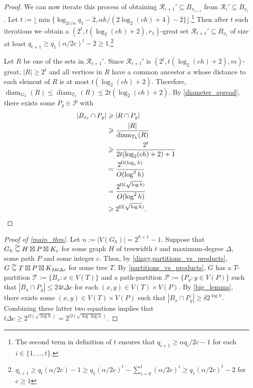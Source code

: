\documentclass{patmorin}
\DeclareMathOperator{\diam}{diam}
\renewcommand{\le}{\leqslant}
\renewcommand{\ge}{\geqslant}
\newcommand\subsetcong{\mathrel{\text{%
    \setbox0\hbox{$\subseteq$}%
    \rlap{\hbox to \wd0{\hss\hss\hss\raisebox{1.5\height}{$\sim$}\hss}}\box0
}}}
\begin{document}
\begin{proof}
  We can now iterate this process of obtaining $\mathcal{R}_{i+1}'\subseteq B_{x_{i+1}}$ from $\mathcal{R}_i'\subseteq B_{x_i}$. Let $t:= \lfloor \min\{\log_{2c/\alpha} q_1-2,\alpha h/(2\log_2(ch)+4)-2\}\rfloor$.\footnote{The second term in definition of $t$ ensures that $q_{i+1}\ge \alpha q_i/2c-1$ for each $i\in\{1,\ldots,t\}$.}   Then after $t$ such iterations we obtain a $(2^t,t(\log_2(ch)+2),r_1)$-great set $\mathcal{R}_{t+1}'\subseteq B_{x_t}$ of size at least $q_{t+1} \ge q_1(\alpha/2c)^t-2 \ge 1$.\footnote{$q_{t+1} \ge q_t(\alpha/2c) - 1 \ge q_1(\alpha/2c)^t - \sum_{i=0}^t (\alpha/2c)^i \ge q_1(\alpha/2c)^t - 2$ for $c\ge 1$}

  Let $R$ be one of the sets in $\mathcal{R}_{t+1}'$.  Since $\mathcal{R}_{t+1}'$ is $(2^t,t(\log_2(ch)+2),m)$-great, $|R|\ge 2^t$ and all vertices in $R$ have a common ancestor $a$ whose distance to each element of $R$ is at most $t(\log_2(ch)+2)$.  Therefore, $\diam_{G_h}(R)\le\diam_{T_h}(R)\le 2t(\log_2(ch)+2)$. By \cref{diameter_spread}, there exists some $P_y\in\mathcal{P}$ with
  \begin{align*}
    |B_{x_t}\cap P_y|
    & \ge |R\cap P_y| \\
    & \ge \frac{|R|}{\diam_{T_h}(R)} \\
    & \ge \frac{2^t}{2t(\log_2(ch)+2)+1} \\
    & = \frac{2^{\Omega(\log_{c} h)}}{O(\log^2 h)} \\
    & = \frac{2^{\Omega(\sqrt{\log h})}}{O(\log^2 h)} \\
    & \ge 2^{\Omega(\sqrt{\log h})} . \qedhere
  \end{align*}
\end{proof}


\begin{proof}[Proof of \cref{main_thm}]
  Let $n:=|V(G_h)|=2^{h+1}-1$.  Suppose that $G_h\subsetcong H\boxtimes P\boxtimes K_c$ for some graph $H$ of treewidth $t$ and maximum-degree $\Delta$, some path $P$ and some integer $c$.  Then, by \cref{dingy,partitions_vs_products}, $G\subsetcong T\boxtimes P\boxtimes K_{24t\Delta c}$ for some tree $T$.  By \cref{partitions_vs_products}, $G$ has a $T$-partition $\mathcal{T}:=\{B_x:x\in V(T)\}$ and a path-partition $\mathcal{P}:=\{P_y:y\in V(P)\}$ such that $|B_x\cap P_y|\le 24t\Delta c$ for each $(x,y)\in V(T)\times V(P)$.  By \cref{big_lemma}, there exists some $(x,y)\in V(T)\times V(P)$ such that $|B_x\cap P_y| \ge \delta 2^{\log h}$.  Combining these latter two equations implies that $t\Delta c\ge 2^{\Omega(\sqrt{\log h})} = 2^{\Omega(\sqrt{\log\log n})}$.
\end{proof}
\end{document}
